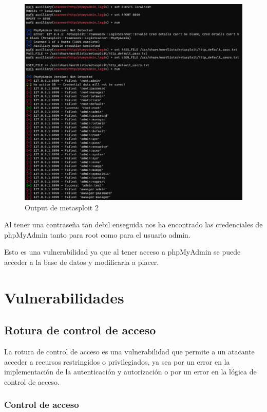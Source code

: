 \documentclass{report}
\begin{document}
            \begin{figure}[H]
                \centering
                \includegraphics[width=\textwidth]{./img/audit1/msf2.png}
                \caption{Output de metasploit 2}
            \end{figure}
            Al tener una contraseña tan debil enseguida nos ha encontrado las credenciales de phpMyAdmin tanto para root como para el usuario admin.
            
            Esto es una vulnerabilidad ya que al tener acceso a phpMyAdmin se puede acceder a la base de datos y modificarla a placer.
        \clearpage
    \chapter{Vulnerabilidades}
        \section{Rotura de control de acceso}
            La rotura de control de acceso es una vulnerabilidad que permite a un atacante acceder a recursos restringidos o privilegiados, ya sea por un error en la implementación de la autenticación y autorización o por un error en la lógica de control de acceso.
            \subsection{Control de acceso}
\end{document}
